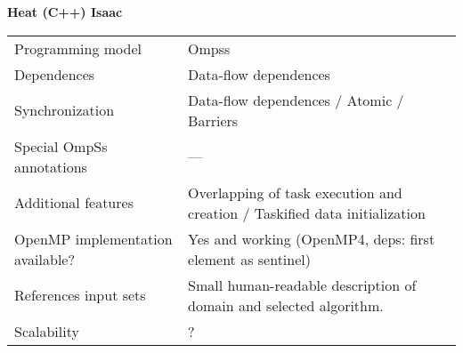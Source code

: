 \section*{}
\label{heat_cxx_isaac}
\centering
\Huge
\textbf{Heat (C++) Isaac}

\begin{table}[h!]
  \large
  \centering
  \begin{tabular}{|l|l|}
    \hline
    Programming model                & Ompss \\
    Dependences                      & Data-flow dependences \\
    Synchronization                  & Data-flow dependences / Atomic / Barriers \\
    Special OmpSs annotations        & --- \\
    Additional features              & Overlapping of task execution and creation / Taskified data initialization \\
    OpenMP implementation available? & Yes and working (OpenMP4, deps: first element as sentinel) \\
    References input sets            & Small human-readable description of domain and selected algorithm. \\
    Scalability                      & ? \\
    \hline
  \end{tabular}
\end{table}

\newpage
